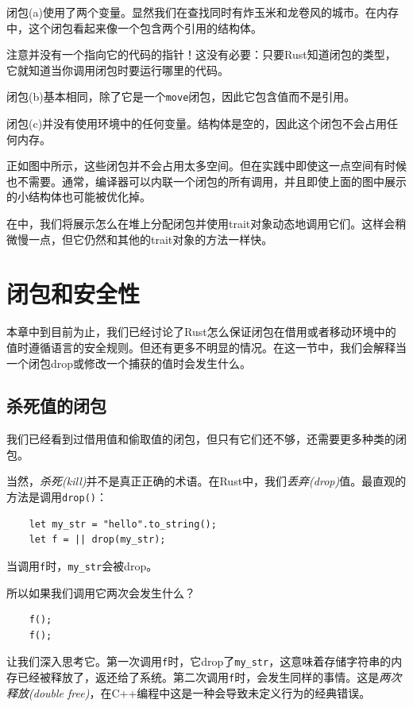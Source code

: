 闭包(a)使用了两个变量。显然我们在查找同时有炸玉米和龙卷风的城市。在内存中，这个闭包看起来像一个包含两个引用的结构体。

注意并没有一个指向它的代码的指针！这没有必要：只要Rust知道闭包的类型，它就知道当你调用闭包时要运行哪里的代码。

闭包(b)基本相同，除了它是一个\texttt{move}闭包，因此它包含值而不是引用。

闭包(c)并没有使用环境中的任何变量。结构体是空的，因此这个闭包不会占用任何内存。

正如图中所示，这些闭包并不会占用太多空间。但在实践中即使这一点空间有时候也不需要。通常，编译器可以内联一个闭包的所有调用，并且即使上面的图中展示的小结构体也可能被优化掉。

在中，我们将展示怎么在堆上分配闭包并使用trait对象动态地调用它们。这样会稍微慢一点，但它仍然和其他的trait对象的方法一样快。

\section{闭包和安全性}

本章中到目前为止，我们已经讨论了Rust怎么保证闭包在借用或者移动环境中的值时遵循语言的安全规则。但还有更多不明显的情况。在这一节中，我们会解释当一个闭包drop或修改一个捕获的值时会发生什么。

\subsection{杀死值的闭包}
我们已经看到过借用值和偷取值的闭包，但只有它们还不够，还需要更多种类的闭包。

当然，\emph{杀死(kill)}并不是真正正确的术语。在Rust中，我们\emph{丢弃(drop)}值。最直观的方法是调用\texttt{drop()}：
\begin{verbatim}
    let my_str = "hello".to_string();
    let f = || drop(my_str);
\end{verbatim}

当调用\texttt{f}时，\texttt{my\_str}会被drop。

所以如果我们调用它两次会发生什么？
\begin{verbatim}
    f();
    f();
\end{verbatim}

让我们深入思考它。第一次调用\texttt{f}时，它drop了\texttt{my\_str}，这意味着存储字符串的内存已经被释放了，返还给了系统。第二次调用\texttt{f}时，会发生同样的事情。这是\emph{两次释放(double free)}，在C++编程中这是一种会导致未定义行为的经典错误。

